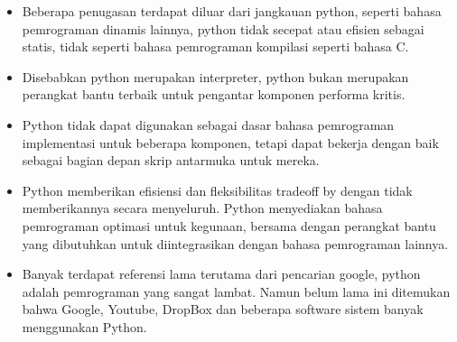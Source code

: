 	\begin{itemize}
		\item Beberapa penugasan terdapat diluar dari jangkauan python, seperti bahasa pemrograman dinamis lainnya, python tidak secepat atau eﬁsien sebagai statis, tidak seperti bahasa pemrograman kompilasi seperti bahasa C. 
		\item Disebabkan python merupakan interpreter, python bukan merupakan perangkat bantu terbaik untuk pengantar komponen performa kritis. 
		\item Python tidak dapat digunakan sebagai dasar bahasa pemrograman implementasi untuk beberapa komponen, tetapi dapat bekerja dengan baik sebagai bagian depan skrip antarmuka untuk mereka. 
		\item Python memberikan eﬁsiensi dan ﬂeksibilitas tradeoff by dengan tidak memberikannya secara menyeluruh. Python menyediakan bahasa pemrograman optimasi untuk kegunaan, bersama dengan perangkat bantu yang dibutuhkan untuk diintegrasikan dengan bahasa pemrograman lainnya.
		\item Banyak terdapat referensi lama terutama dari pencarian google, python adalah pemrograman yang sangat lambat. Namun belum lama ini ditemukan bahwa Google, Youtube, DropBox dan beberapa software sistem banyak menggunakan Python.
	\end{itemize}
	

		
		
